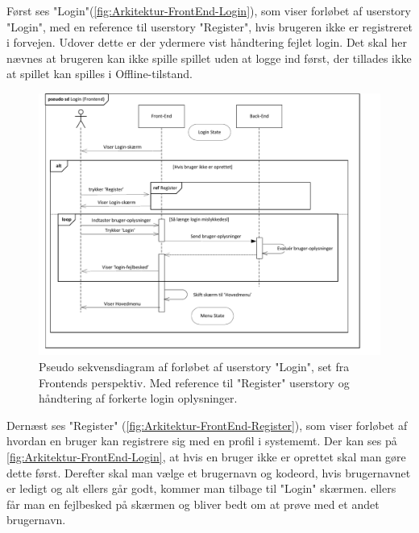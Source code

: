 \noindent Først ses "Login"(\autoref{fig:Arkitektur-FrontEnd-Login}), som viser forløbet af userstory "Login", med en reference til userstory "Register", hvis brugeren ikke er registreret i forvejen. Udover dette er der ydermere vist håndtering fejlet login. Det skal her nævnes at brugeren kan ikke spille spillet uden at logge ind først, der tillades ikke at spillet kan spilles i Offline-tilstand.\\

\begin{figure}[h]
\centering
\includegraphics[width = \textwidth]{02-Body/Images/Front-End_-_Arkitektur-login.pdf}
\caption{Pseudo sekvensdiagram af forløbet af userstory "Login", set fra Frontends perspektiv. Med reference til "Register" userstory og håndtering af forkerte login oplysninger.}
\label{fig:Arkitektur-FrontEnd-Login}
\end{figure}

\noindent Dernæst ses "Register" (\autoref{fig:Arkitektur-FrontEnd-Register}), som viser forløbet af hvordan en bruger kan registrere sig med en profil i systememt. Der kan ses på \autoref{fig:Arkitektur-FrontEnd-Login}, at hvis en bruger ikke er oprettet skal man gøre dette først. Derefter skal man vælge et brugernavn og kodeord, hvis brugernavnet er ledigt og alt ellers går godt, kommer man tilbage til "Login" skærmen. ellers får man en fejlbesked på skærmen og bliver bedt om at prøve med et andet brugernavn.\\

